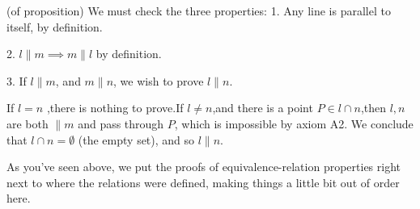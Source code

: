 \begin{isabellebody}
\begin{isamarkuptext}
\begin{hartshorne}
\proof (of proposition)
We must check the three properties:
1. Any line is parallel to itself, by definition. 

2. $l \parallel m \implies m \parallel l$ by definition.

3. If $l \parallel m$, and $m \parallel n$, we wish to prove $l \parallel n.$

If $l=n$ ,there is nothing to prove.If $l \ne n$,and there is a point
$P \in l \cap n$,then $l, n$ are both $\parallel m$ and pass through $P$, which is impossible by 
axiom A2. We conclude that $l \cap n = \emptyset$ (the empty set), and so $l \parallel n.$
\end{hartshorne}%
\end{isamarkuptext}\isamarkuptrue%
%
\begin{isamarkuptext}%
\spike
As you've seen above, we put the proofs of equivalence-relation properties right next to where the relations
were defined, making things a little bit out of order here. 


\end{isamarkuptext}
\end{isabellebody}
